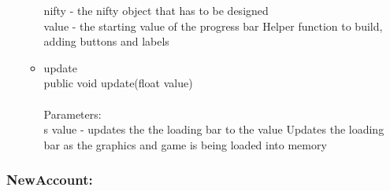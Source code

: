 \documentclass[letterpaper]{article}
\begin{document}
\begin{itemize}
\begin{itemize}
													nifty - the nifty object that has to be designed \\
													value - the starting value of the progress bar Helper function to build, adding buttons and labels
											\item	update \\
													public void update(float value) \\ \\
													Parameters: \\s
													value - updates the the loading bar to the value Updates the loading bar as the graphics and game is being loaded into memory
										\end{itemize}
							\end{itemize}
							
						\subsubsection*{NewAccount:}
						\vspace{0.1in}	
\end{document}
